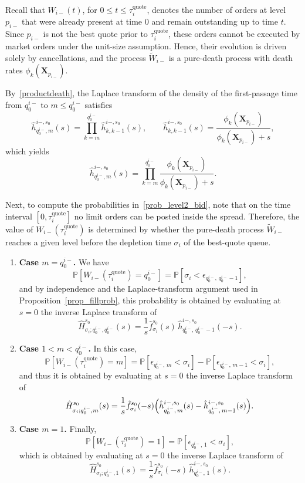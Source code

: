 \documentclass[11pt]{article}
\newenvironment{proof}{\noindent{\it Proof.}}{\hfill\fbox{}\vspace*{1mm}}
\begin{document}
\begin{proof}
Recall that $W_{i-}(t)$, for $0\leq t\leq \tau_i^{\text{quote}}$, denotes the number of orders at level $p_{i-}$ that were already present at time $0$ and remain outstanding up to time $t$. Since $p_{i-}$ is not the best quote prior to $\tau_i^{\text{quote}}$, these orders cannot be executed by market orders under the unit-size assumption. Hence, their evolution is driven solely by cancellations, and the process $\tilde{W}_{i-}$ is a pure-death process with death rates $\phi_k(\boldsymbol{X}_{p_{i-}})$.

By~\eqref{productdeath}, the Laplace transform of the density of the first-passage time from $q_0^{i-}$ to $m\leq q_0^{i-}$ satisfies
\[
\hat{h}_{q_0^{i-},m}^{i-,s_0}(s)
=
\prod_{k=m}^{q_0^{i-}}
\hat{h}_{k,k-1}^{i-,s_0}(s),
\qquad
\hat{h}_{k,k-1}^{i-,s_0}(s)
=
\frac{\phi_k(\boldsymbol{X}_{p_{i-}})}{\phi_k(\boldsymbol{X}_{p_{i-}})+s},
\]
which yields
\[
\hat{h}_{q_0^{i-},m}^{i-,s_0}(s)
=
\prod_{k=m}^{q_0^{i-}}
\frac{\phi_k(\boldsymbol{X}_{p_{i-}})}
{\phi_k(\boldsymbol{X}_{p_{i-}})+s}.
\]

Next, to compute the probabilities in~\eqref{prob_level2_bid}, note that on the time interval $[0,\tau_i^{\text{quote}}]$ no limit orders can be posted inside the spread. Therefore, the value of $W_{i-}(\tau_i^{\text{quote}})$ is determined by whether the pure-death process $\tilde{W}_{i-}$ reaches a given level before the depletion time $\sigma_i$ of the best-quote queue.

\begin{enumerate}
\item[\textbf{(i)}]\textbf{Case $m=q_0^{i-}$.}
We have
\[
\mathbb{P}[W_{i-}(\tau_i^{\text{quote}})=q_0^{i-}]
=
\mathbb{P}[\sigma_i<\epsilon_{q_0^{i-},\,q_0^{i-}-1}],
\]
and by independence and the Laplace-transform argument used in Proposition~\ref{prop_fillprob},
this probability is obtained by evaluating at $s=0$ the inverse Laplace transform of
\[
\hat{H}^{s_0}_{\sigma_i; q_0^{i-}, q_0^{i-}}(s)
=
\frac{1}{s}\hat{f}^{s_0}_{\sigma_i}(s)\,
\hat{h}^{i-, s_0}_{q_0^{i-},\,q_0^{i-}-1}(-s).
\]


\item[\textbf{(ii)}]\textbf{Case $1<m<q_0^{i-}$.}
In this case,
\[
\mathbb{P}[W_{i-}(\tau_i^{\text{quote}})=m]
=
\mathbb{P}[\epsilon_{q_0^{i-},\,m}<\sigma_i]
-
\mathbb{P}[\epsilon_{q_0^{i-},\,m-1}<\sigma_i],
\]
and thus it is obtained by evaluating at $s=0$ the inverse Laplace transform of
\[
\hat{H}^{s_0}_{\sigma_i; q_0^{i-}, m}(s)
=
\frac{1}{s}\hat{f}^{s_0}_{\sigma_i}(-s)
\Bigl(
\hat{h}^{i-, s_0}_{q_0^{i-},\,m}(s)
-
\hat{h}^{i-, s_0}_{q_0^{i-},\,m-1}(s)
\Bigr).
\]

\item[\textbf{(iii)}]\textbf{Case $m=1$.}
Finally,
\[
\mathbb{P}[W_{i-}(\tau_i^{\text{quote}})=1]
=
\mathbb{P}[\epsilon_{q_0^{i-},\,1}<\sigma_i],
\]
which is obtained by evaluating at $s=0$ the inverse Laplace transform of
\[
\hat{H}^{s_0}_{\sigma_i; q_0^{i-}, 1}(s)
=
\frac{1}{s}\hat{f}^{s_0}_{\sigma_i}(-s)\,
\hat{h}^{i-, s_0}_{q_0^{i-},\,1}(s).
\]
\end{enumerate}
\end{proof}
\end{document}
